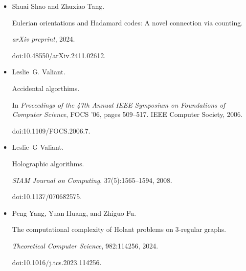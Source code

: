 \documentclass[10pt,a4paper]{article}
\begin{document}
\begin{itemize}
In \emph{2020 IEEE 61st Annual Symposium on Foundations of Computer
Science (FOCS)}, pages 1091–1102. IEEE, 2020.


doi:10.1109/FOCS46700.2020.00105.





\item[] 
[27]

Shuai Shao and Zhuxiao Tang.


Eulerian orientations and Hadamard codes: A novel connection via
counting.


\emph{arXiv preprint}, 2024.


doi:10.48550/arXiv.2411.02612.





\item[] 
[28]

Leslie G. Valiant.


Accidental algorthims.


In \emph{Proceedings of the 47th Annual IEEE Symposium on Foundations
of Computer Science}, FOCS ’06, pages 509–517. IEEE Computer Society, 2006.


doi:10.1109/FOCS.2006.7.





\item[] 
[29]

Leslie G Valiant.


Holographic algorithms.


\emph{SIAM Journal on Computing}, 37(5):1565–1594, 2008.


doi:10.1137/070682575.





\item[] 
[30]

Peng Yang, Yuan Huang, and Zhiguo Fu.


The computational complexity of Holant problems on 3-regular
graphs.


\emph{Theoretical Computer Science}, 982:114256, 2024.


doi:10.1016/j.tcs.2023.114256.





\end{itemize}
\end{document}
